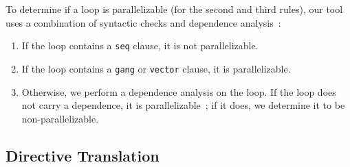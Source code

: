 \documentclass{sig-alternate-05-2015}
\newcommand{\squish}{
     { \setlength{\itemsep}{0pt}      \setlength{\parsep}{3pt}
       \setlength{\topsep}{3pt}       \setlength{\partopsep}{0pt}
       \setlength{\leftmargin}{1.5em} \setlength{\labelwidth}{1em}
       \setlength{\labelsep}{0.5em} } }
\begin{document}
To determine if a loop is parallelizable (for the second and third rules), our
tool uses a combination of syntactic checks and dependence
analysis~\cite{wolfe,kennedy}:
\begin{enumerate}\squish
\item If the loop contains a \texttt{seq} clause, it is not parallelizable.
\item If the loop contains a \texttt{gang} or \texttt{vector} clause, it is
parallelizable.
\item Otherwise, we perform a dependence analysis on the loop.  If the loop
does not carry a dependence, it is parallelizable~\cite{kennedy}; if it
does, we determine it to be non-parallelizable.
\end{enumerate}

\subsection{Directive Translation}
\label{sec:directives}
\end{document}
